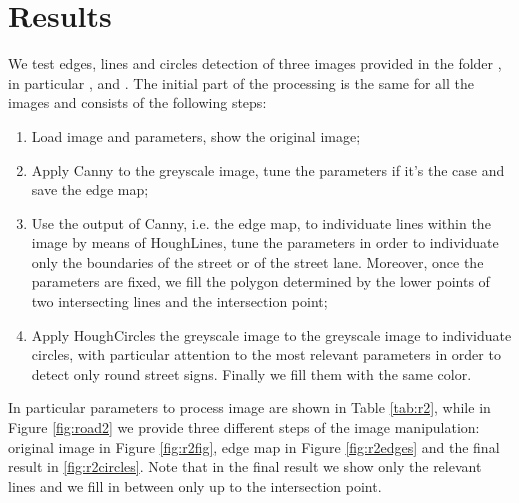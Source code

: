 \documentclass[twoside,onecolumn]{article}
\theoremstyle{definition}
\begin{document}
\section{Results}
We test edges, lines and circles detection of three images provided in the folder , in particular ,   and .
The initial part of the processing is the same for all the images and consists of the following steps:
\begin{enumerate}
\item Load image and parameters, show the original image;
\item Apply Canny to the greyscale image, tune the parameters if it's the case and save the edge map;
\item Use the output of Canny, i.e. the edge map, to individuate lines within the image by means of HoughLines, tune the parameters in order to individuate only the boundaries of the street or of the street lane. Moreover, once the parameters are fixed, we fill the polygon determined by the lower points of two intersecting lines and the intersection point;
\item  Apply HoughCircles the greyscale image to the greyscale image to individuate circles, with particular attention to the most relevant parameters in order to detect only round street signs. Finally we fill them with the same color.
\end{enumerate}

In particular parameters to process image  are shown in Table \ref{tab:r2}, while in Figure \ref{fig:road2} we provide three different steps of the image manipulation: original image in Figure \ref{fig:r2fig}, edge map in Figure \ref{fig:r2edges} and the final result in \ref{fig:r2circles}. Note that in the final result we show only the relevant lines and we fill in between only up to the intersection point. 
\end{document}
